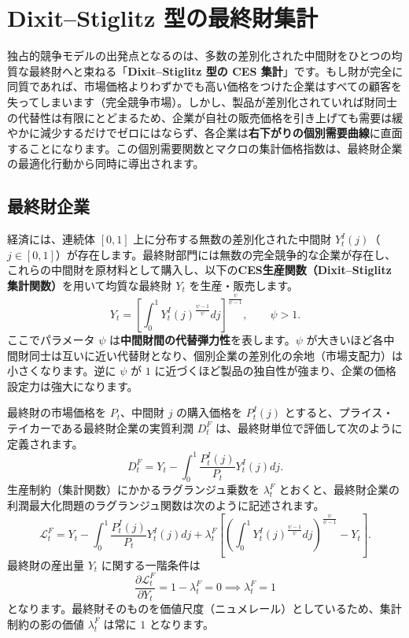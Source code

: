 \documentclass[
  japanese,
  lualatex,
  ja=standard,
  12pt,
  a4paper]{ltjsarticle}
\begin{document}
\section{Dixit--Stiglitz
型の最終財集計}\label{dixitstiglitz-ux578bux306eux6700ux7d42ux8ca1ux96c6ux8a08}

独占的競争モデルの出発点となるのは、多数の差別化された中間財をひとつの均質な最終財へと束ねる「\textbf{Dixit--Stiglitz
型の CES
集計}」です。もし財が完全に同質であれば、市場価格よりわずかでも高い価格をつけた企業はすべての顧客を失ってしまいます（完全競争市場）。しかし、製品が差別化されていれば財同士の代替性は有限にとどまるため、企業が自社の販売価格を引き上げても需要は緩やかに減少するだけでゼロにはならず、各企業は\textbf{右下がりの個別需要曲線}に直面することになります。この個別需要関数とマクロの集計価格指数は、最終財企業の最適化行動から同時に導出されます。

\subsection{最終財企業}\label{ux6700ux7d42ux8ca1ux4f01ux696d}

経済には、連続体 \([0, 1]\) 上に分布する無数の差別化された中間財
\(Y_t^I(j)\)（\(j \in [0, 1]\)）が存在します。最終財部門には無数の完全競争的な企業が存在し、これらの中間財を原材料として購入し、以下の\textbf{CES生産関数（Dixit--Stiglitz
集計関数）}を用いて均質な最終財 \(Y_t\) を生産・販売します。 \[
Y_t = \left[ \int_0^1 Y_t^I(j)^{\frac{\psi-1}{\psi}} dj \right]^{\frac{\psi}{\psi-1}}, \qquad \psi > 1.
\] ここでパラメータ \(\psi\)
は\textbf{中間財間の代替弾力性}を表します。\(\psi\)
が大きいほど各中間財同士は互いに近い代替財となり、個別企業の差別化の余地（市場支配力）は小さくなります。逆に
\(\psi\) が \(1\)
に近づくほど製品の独自性が強まり、企業の価格設定力は強大になります。

最終財の市場価格を \(P_t\)、中間財 \(j\) の購入価格を \(P_t^I(j)\)
とすると、プライス・テイカーである最終財企業の実質利潤 \(D_t^F\)
は、最終財単位で評価して次のように定義されます。 \[
D_t^F = Y_t - \int_0^1 \frac{P_t^I(j)}{P_t} Y_t^I(j) dj.
\] 生産制約（集計関数）にかかるラグランジュ乗数を \(\lambda_t^F\)
とおくと、最終財企業の利潤最大化問題のラグランジュ関数は次のように記述されます。
\[
\mathcal{L}_t^F = Y_t - \int_0^1 \frac{P_t^I(j)}{P_t} Y_t^I(j) dj + \lambda_t^F \left[ \left( \int_0^1 Y_t^I(j)^{\frac{\psi-1}{\psi}} dj \right)^{\frac{\psi}{\psi-1}} - Y_t \right].
\] 最終財の産出量 \(Y_t\) に関する一階条件は \[
\frac{\partial \mathcal{L}_t^F}{\partial Y_t} = 1 - \lambda_t^F = 0 \implies \lambda_t^F = 1
\]
となります。最終財そのものを価値尺度（ニュメレール）としているため、集計制約の影の価値
\(\lambda_t^F\) は常に \(1\) となります。
\end{document}
